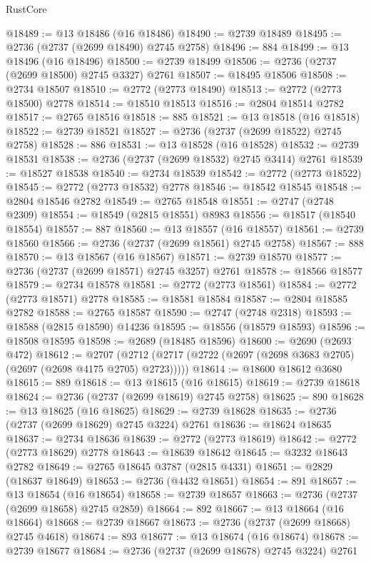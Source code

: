 \begin{lexlean}{RustCore}
\begin{coremodule}
@18489 := @13 @18486 (@16 @18486)
@18490 := @2739 @18489
@18495 := @2736 (@2737 (@2699 @18490) @2745 @2758)
@18496 := 884
@18499 := @13 @18496 (@16 @18496)
@18500 := @2739 @18499
@18506 := @2736 (@2737 (@2699 @18500) @2745 @3327) @2761
@18507 := @18495 @18506
@18508 := @2734 @18507
@18510 := @2772 (@2773 @18490)
@18513 := @2772 (@2773 @18500) @2778
@18514 := @18510 @18513
@18516 := @2804 @18514 @2782
@18517 := @2765 @18516
@18518 := 885
@18521 := @13 @18518 (@16 @18518)
@18522 := @2739 @18521
@18527 := @2736 (@2737 (@2699 @18522) @2745 @2758)
@18528 := 886
@18531 := @13 @18528 (@16 @18528)
@18532 := @2739 @18531
@18538 := @2736 (@2737 (@2699 @18532) @2745 @3414) @2761
@18539 := @18527 @18538
@18540 := @2734 @18539
@18542 := @2772 (@2773 @18522)
@18545 := @2772 (@2773 @18532) @2778
@18546 := @18542 @18545
@18548 := @2804 @18546 @2782
@18549 := @2765 @18548
@18551 := @2747 (@2748 @2309)
@18554 := @18549 (@2815 @18551) @8983
@18556 := @18517 (@18540 @18554)
@18557 := 887
@18560 := @13 @18557 (@16 @18557)
@18561 := @2739 @18560
@18566 := @2736 (@2737 (@2699 @18561) @2745 @2758)
@18567 := 888
@18570 := @13 @18567 (@16 @18567)
@18571 := @2739 @18570
@18577 := @2736 (@2737 (@2699 @18571) @2745 @3257) @2761
@18578 := @18566 @18577
@18579 := @2734 @18578
@18581 := @2772 (@2773 @18561)
@18584 := @2772 (@2773 @18571) @2778
@18585 := @18581 @18584
@18587 := @2804 @18585 @2782
@18588 := @2765 @18587
@18590 := @2747 (@2748 @2318)
@18593 := @18588 (@2815 @18590) @14236
@18595 := @18556 (@18579 @18593)
@18596 := @18508 @18595
@18598 := @2689 (@18485 @18596)
@18600 := @2690 (@2693 @472)
@18612 := @2707
    (@2712 (@2717 (@2722 (@2697 (@2698 @3683 @2705) (@2697 (@2698 @4175 @2705) @2723)))))
@18614 := @18600 @18612 @3680
@18615 := 889
@18618 := @13 @18615 (@16 @18615)
@18619 := @2739 @18618
@18624 := @2736 (@2737 (@2699 @18619) @2745 @2758)
@18625 := 890
@18628 := @13 @18625 (@16 @18625)
@18629 := @2739 @18628
@18635 := @2736 (@2737 (@2699 @18629) @2745 @3224) @2761
@18636 := @18624 @18635
@18637 := @2734 @18636
@18639 := @2772 (@2773 @18619)
@18642 := @2772 (@2773 @18629) @2778
@18643 := @18639 @18642
@18645 := @3232 @18643 @2782
@18649 := @2765 @18645 @3787 (@2815 @4331)
@18651 := @2829 (@18637 @18649)
@18653 := @2736 (@4432 @18651)
@18654 := 891
@18657 := @13 @18654 (@16 @18654)
@18658 := @2739 @18657
@18663 := @2736 (@2737 (@2699 @18658) @2745 @2859)
@18664 := 892
@18667 := @13 @18664 (@16 @18664)
@18668 := @2739 @18667
@18673 := @2736 (@2737 (@2699 @18668) @2745 @4618)
@18674 := 893
@18677 := @13 @18674 (@16 @18674)
@18678 := @2739 @18677
@18684 := @2736 (@2737 (@2699 @18678) @2745 @3224) @2761

\end{coremodule}
\end{lexlean}
